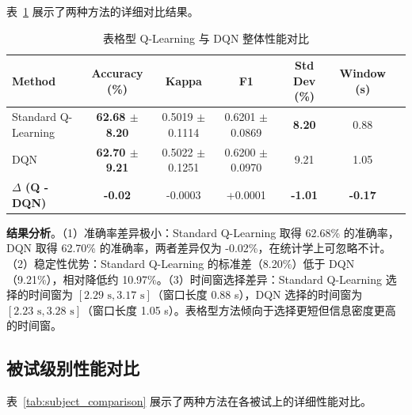 表~\ref{tab:tableq_dqn_comparison} 展示了两种方法的详细对比结果。

\begin{table}[H]
\centering
\caption{表格型 Q-Learning 与 DQN 整体性能对比}
\label{tab:tableq_dqn_comparison}
\small
\begin{tabular}{lcccccc}
\hline
\textbf{Method} & \textbf{Accuracy (\%)} & \textbf{Kappa} & \textbf{F1} & \textbf{Std Dev (\%)} & \textbf{Window (s)} \\
\hline
Standard Q-Learning & \textbf{62.68 $\pm$ 8.20} & 0.5019 $\pm$ 0.1114 & 0.6201 $\pm$ 0.0869 & \textbf{8.20} & 0.88 \\
DQN & \textbf{62.70 $\pm$ 9.21} & 0.5022 $\pm$ 0.1251 & 0.6200 $\pm$ 0.0970 & 9.21 & 1.05 \\
\textbf{$\Delta$ (Q - DQN)} & \textbf{-0.02} & -0.0003 & +0.0001 & \textbf{-1.01} & \textbf{-0.17} \\
\hline
\end{tabular}
\end{table}

\textbf{结果分析}。（1）准确率差异极小：Standard Q-Learning 取得 62.68\% 的准确率，DQN 取得 62.70\% 的准确率，两者差异仅为 -0.02\%，在统计学上可忽略不计。（2）稳定性优势：Standard Q-Learning 的标准差（8.20\%）低于 DQN（9.21\%），相对降低约 10.97\%。（3）时间窗选择差异：Standard Q-Learning 选择的时间窗为 $[2.29\text{ s}, 3.17\text{ s}]$（窗口长度 0.88 s），DQN 选择的时间窗为 $[2.23\text{ s}, 3.28\text{ s}]$（窗口长度 1.05 s）。表格型方法倾向于选择更短但信息密度更高的时间窗。

\subsection{被试级别性能对比}
\label{subsec:subject_level_comparison}

表~\ref{tab:subject_comparison} 展示了两种方法在各被试上的详细性能对比。

